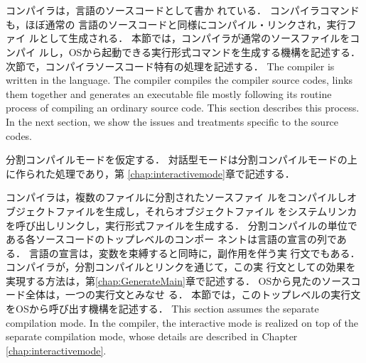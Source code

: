 \section{}
\label{sec:SimpleMain.reateExec}

\ifjp%
	\smlsharp{}コンパイラは，\smlsharp{}言語のソースコードとして書か
れている．
	\smlsharp{}コンパイラコマンドも，ほぼ通常の
\smlsharp{}言語のソースコードと同様にコンパイル・リンクされ，実行ファイ
ルとして生成される．
	本節では，\smlsharp{}コンパイラが通常のソースファイルをコンパイ
ルし，OSから起動できる実行形式コマンドを生成する機構を記述する．
	次節で，\smlsharp{}コンパイラソースコード特有の処理を記述する．
\else%
	The \smlsharp{} compiler is written in the \smlsharp{} language.
	The \smlsharp{} compiler compiles the \smlsharp{} compiler
source codes, links them together and generates an executable file
mostly following its routine process of compiling an ordinary source
code.
	This section describes this process.
	In the next section, we show the issues and treatments specific
to the \smlsharp{} source codes.
\fi%

\ifjp%
	分割コンパイルモードを仮定する．
	対話型モードは分割コンパイルモードの上に作られた処理であり，第
\ref{chap:interactivemode}章で記述する．

	\smlsharp{}コンパイラは，複数のファイルに分割されたソースファイ
ルをコンパイルしオブジェクトファイルを生成し，それらオブジェクトファイル
をシステムリンカを呼び出しリンクし，実行形式ファイルを生成する．
	分割コンパイルの単位である各ソースコードのトップレベルのコンポー
ネントは\smlsharp{}言語の宣言の列である．
	\smlsharp{}言語の宣言は，変数を束縛すると同時に，副作用を伴う実
行文でもある．
	\smlsharp{}コンパイラが，分割コンパイルとリンクを通じて，この実
行文としての効果を実現する方法は，第\ref{chap:GenerateMain}章で記述する．
	OSから見た\smlsharp{}のソースコード全体は，一つの実行文とみなせ
る．
	本節では，このトップレベルの実行文をOSから呼び出す機構を記述する．
\else%
	This section assumes the separate compilation mode.
	In the \smlsharp{} compiler, the interactive mode is realized
on top of the separate compilation mode, whose details are described in
Chapter \ref{chap:interactivemode}.

